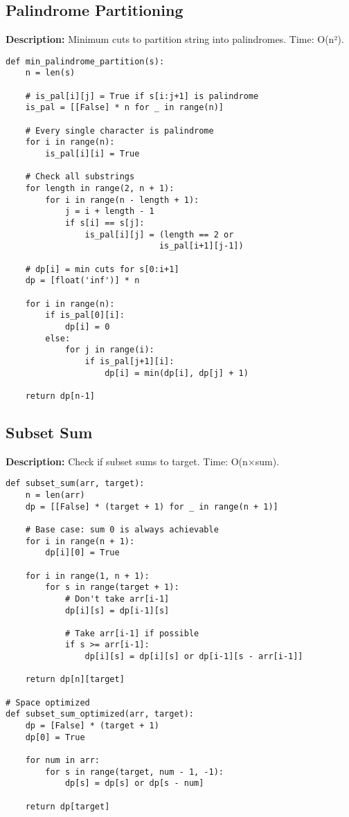 \subsection{Palindrome Partitioning}
\textbf{Description:} Minimum cuts to partition string into palindromes. Time: O(n²).

\begin{lstlisting}
def min_palindrome_partition(s):
    n = len(s)
    
    # is_pal[i][j] = True if s[i:j+1] is palindrome
    is_pal = [[False] * n for _ in range(n)]
    
    # Every single character is palindrome
    for i in range(n):
        is_pal[i][i] = True
    
    # Check all substrings
    for length in range(2, n + 1):
        for i in range(n - length + 1):
            j = i + length - 1
            if s[i] == s[j]:
                is_pal[i][j] = (length == 2 or 
                               is_pal[i+1][j-1])
    
    # dp[i] = min cuts for s[0:i+1]
    dp = [float('inf')] * n
    
    for i in range(n):
        if is_pal[0][i]:
            dp[i] = 0
        else:
            for j in range(i):
                if is_pal[j+1][i]:
                    dp[i] = min(dp[i], dp[j] + 1)
    
    return dp[n-1]
\end{lstlisting}

\subsection{Subset Sum}
\textbf{Description:} Check if subset sums to target. Time: O(n×sum).

\begin{lstlisting}
def subset_sum(arr, target):
    n = len(arr)
    dp = [[False] * (target + 1) for _ in range(n + 1)]
    
    # Base case: sum 0 is always achievable
    for i in range(n + 1):
        dp[i][0] = True
    
    for i in range(1, n + 1):
        for s in range(target + 1):
            # Don't take arr[i-1]
            dp[i][s] = dp[i-1][s]
            
            # Take arr[i-1] if possible
            if s >= arr[i-1]:
                dp[i][s] = dp[i][s] or dp[i-1][s - arr[i-1]]
    
    return dp[n][target]

# Space optimized
def subset_sum_optimized(arr, target):
    dp = [False] * (target + 1)
    dp[0] = True
    
    for num in arr:
        for s in range(target, num - 1, -1):
            dp[s] = dp[s] or dp[s - num]
    
    return dp[target]
\end{lstlisting}
